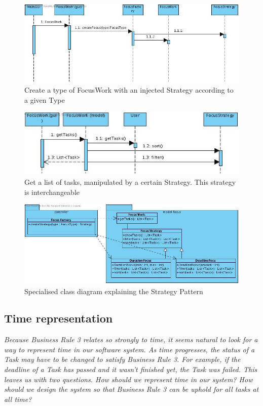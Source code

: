 		\begin{figure}[H]
			\begin{center}
				\includegraphics[scale=0.5]{images/FocusFactory.jpg}
			\end{center}
			\caption{Create a type of FocusWork with an injected Strategy according to a given Type}
		\end{figure}
		\begin{figure}[H]
			\begin{center}
				\includegraphics[scale=0.5]{images/FocusStrategy.jpg}
			\end{center}
			\caption{Get a list of tasks, manipulated by a certain Strategy. This strategy is interchangeable}
		\end{figure}
		\begin{figure}[H]
			\begin{center}
				\includegraphics[scale=0.5]{images/focus_class_diagram.jpg}
			\end{center}
			\caption{Specialised class diagram explaining the Strategy Pattern}
		\end{figure}
		\subsection{Time representation}
		\emph{
		Because Business Rule 3 relates so strongly to time, it seems natural to look for a way to represent time in our software system. As time progresses, the status of a Task may have to be changed to satisfy Business Rule 3. For example, if the deadline of a Task has passed and it wasn't finished yet, the Task was failed. This leaves us with two questions. How should we represent time in our system? How should we design the system so that Business Rule 3 can be uphold for all tasks at all time?}
		
